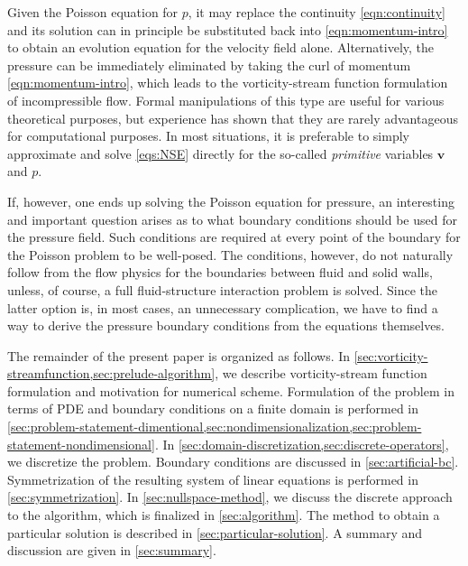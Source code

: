 \documentclass{article}
\numberwithin{equation}{section}
\begin{document}
Given the Poisson equation for $p$, it may replace the continuity \cref{eqn:continuity} and its solution can in principle be substituted back into \cref{eqn:momentum-intro} to obtain an evolution equation for the velocity field alone. Alternatively, the pressure can be immediately eliminated by taking the $\mathrm{curl}$ of momentum \cref{eqn:momentum-intro}, which leads to the vorticity-stream function formulation of incompressible flow. Formal manipulations of this type are useful for various theoretical purposes, but experience has shown that they are rarely advantageous for computational purposes. In most situations, it is preferable to simply approximate and solve \cref{eqs:NSE} directly for the so-called \textit{primitive} variables $\boldsymbol{v}$ and $p$.

If, however, one ends up solving the Poisson equation for pressure, an interesting and important question arises as to what boundary conditions should be used for the pressure field. Such conditions are required at every point of the boundary for the Poisson problem to be well-posed. The conditions, however, do not naturally follow from the flow physics for the boundaries between fluid and solid walls, unless, of course, a full fluid-structure interaction problem is solved. Since the latter option is, in most cases, an unnecessary complication, we have to find a way to derive the pressure boundary conditions from the equations themselves.

The remainder of the present paper is organized as follows. 
	In \cref{sec:vorticity-streamfunction,sec:prelude-algorithm}, we describe vorticity-stream function formulation and motivation for numerical scheme. 
	Formulation of the problem in terms of PDE and boundary conditions on a finite domain is performed in \cref{sec:problem-statement-dimentional,sec:nondimensionalization,sec:problem-statement-nondimensional}. 
	In \cref{sec:domain-discretization,sec:discrete-operators}, we discretize the problem. 
	Boundary conditions are discussed in \cref{sec:artificial-bc}. 
	Symmetrization of the resulting system of linear equations is performed in \cref{sec:symmetrization}.
	In \cref{sec:nullspace-method}, we discuss the discrete approach to the algorithm, which is finalized in \cref{sec:algorithm}. 
	The method to obtain a particular solution is described in \cref{sec:particular-solution}.
	A summary and discussion are given in \cref{sec:summary}.
	
\end{document}
